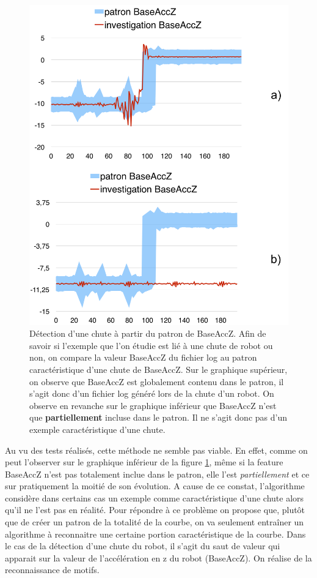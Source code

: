 \begin{figure}[h]
	\centering\includegraphics[width=12cm]{images/patron_comp.png}
	\caption[Détection d'une chute à partir du patron de BaseAccZ]{Détection d'une chute à partir du patron de BaseAccZ. Afin de savoir si l'exemple que l'on étudie est lié à une chute de robot ou non, on compare la valeur BaseAccZ du fichier log au patron caractéristique d'une chute de BaseAccZ. Sur le graphique supérieur, on observe que BaseAccZ est globalement contenu dans le patron, il s'agit donc d'un fichier log généré lors de la chute d'un robot. On observe en revanche sur le graphique inférieur que BaseAccZ n'est que \textbf{partiellement} incluse dans le patron. Il ne s'agit donc pas d'un exemple caractéristique d'une chute. }
	\label{fig:Détection d'une chute à partir du patron de BaseAccZ}
\end{figure}

Au vu des tests réalisés, cette méthode ne semble pas viable. En effet, comme on peut l'observer sur le graphique inférieur de la figure \ref{fig:Détection d'une chute à partir du patron de BaseAccZ}, même si la feature BaseAccZ n'est pas totalement inclue dans le patron, elle l'est \emph{partiellement} et ce sur pratiquement la moitié de son évolution. A cause de ce constat, l'algorithme considère dans certains cas un exemple comme caractéristique d'une chute alors qu'il ne l'est pas en réalité. Pour répondre à ce problème on propose que, plutôt que de créer un patron de la totalité de la courbe, on va seulement entraîner un algorithme à reconnaitre une certaine portion caractéristique de la courbe. Dans le cas de la détection d'une chute du robot, il s'agit du saut de valeur qui apparait sur la valeur de l'accélération en z du robot (BaseAccZ). On réalise de la reconnaissance de motifs. 

